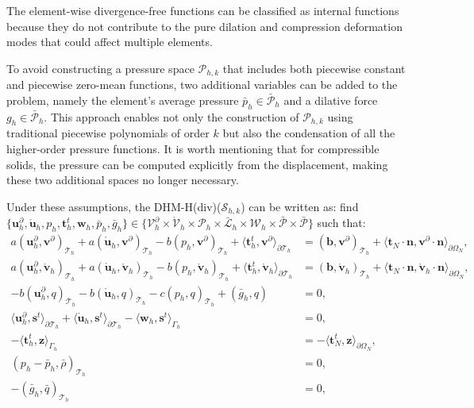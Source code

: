 \documentclass[english,11pt,3p,number,sort&compress]{elsarticle}
\begin{document}
The element-wise divergence-free functions can be classified as internal functions because they do not contribute to the pure dilation and compression deformation modes that could affect multiple elements.

To avoid constructing a pressure space $\mathcal{P}_{h,k}$ that includes both piecewise constant and piecewise zero-mean functions, two additional variables can be added to the problem, namely the element's average pressure $\bar{p}_h \in \bar{\mathcal{P}}_h$ and a dilative force $g_h \in \bar{\mathcal{P}}_{h}$. This approach enables not only the construction of $\mathcal{P}_{h,k}$ using traditional piecewise polynomials of order $k$ but also the condensation of all the higher-order pressure functions. It is worth mentioning that for compressible solids, the pressure can be computed explicitly from the displacement, making these two additional spaces no longer necessary.

Under these assumptions, the DHM-H(div)($\mathcal{S}_{h,k}$) can be written as: find $\{\bm{u}^\partial_h,\mathring{\bm{u}}_h,p_h,\bm{t}^t_h,\bm{w}_h,\bar{p}_h,\bar{g}_h\} \in \{\mathcal{V}^\partial_h \times \mathring{\mathcal{V}}_h \times \mathcal{P}_h \times \bar{\mathcal{L}}_h \times \mathcal{W}_h \times \bar{\mathcal{P}} \times \bar{\mathcal{P}} \}$ such that:
\begin{subequations} \label{eq:double-hybrid-six-field}
	\begin{align}
		a(\bm{u}^\partial_h,\bm{v}^\partial)_{\mathcal{T}_h} + a(\mathring{\bm{u}}_h,\bm{v}^\partial)_{\mathcal{T}_h} - b( p_h, \bm{v}^\partial)_{\mathcal{T}_h} +\langle\bm{t}^t_h,\bm{v}^\partial\rangle_{\partial\mathcal{T}_h} &= (\bm{b},\bm{v}^\partial)_{\mathcal{T}_h} + \langle\bm{t}_N\cdot\bm{n},\bm{v}^\partial\cdot\bm{n}\rangle_{\partial\Omega_N}, \label{eq:double-hybrid-six-field-a}\\
		a(\bm{u}^\partial_h,\mathring{\bm{v}}_h)_{\mathcal{T}_h} + a(\mathring{\bm{u}}_h,\mathring{\bm{v}}_h)_{\mathcal{T}_h} - b( p_h, \mathring{\bm{v}}_h)_{\mathcal{T}_h} +\langle\bm{t}^t_h,\mathring{\bm{v}}_h\rangle_{\partial\mathcal{T}_h} &= (\bm{b},\mathring{\bm{v}}_h)_{\mathcal{T}_h} + \langle\bm{t}_N\cdot\bm{n},\mathring{\bm{v}}_h\cdot\bm{n}\rangle_{\partial\Omega_N}, \label{eq:double-hybrid-six-field-b}\\ 
		-b(\bm{u}^\partial_h, q)_{\mathcal{T}_h} - b(\mathring{\bm{u}}_h, q)_{\mathcal{T}_h} - c(p_h,q)_{\mathcal{T}_h} + (\bar{g}_h,q) &= 0, \label{eq:double-hybrid-six-field-c}\\
		\langle\bm{u}^\partial_h,\bm{s}^t\rangle_{\partial\mathcal{T}_h} + \langle\mathring{\bm{u}}_h,\bm{s}^t\rangle_{\partial\mathcal{T}_h} - \langle\bm{w}_h,\bm{s}^t\rangle_{\Gamma_h} &= 0, \label{eq:double-hybrid-six-field-d}\\
		-\langle\bm{t}^t_h,\bm{z}\rangle_{\Gamma_h} &= -\langle\bm{t}_N^t,\bm{z}\rangle_{\partial\Omega_N}, \label{eq:double-hybrid-six-field-e}\\
		(p_h-\bar{p}_h,\bar{\rho})_{\mathcal{T}_h} &= 0, \label{eq:double-hybrid-six-field-f}\\
		-(\bar{g}_h,\bar{q})_{\mathcal{T}_h} &= 0, \label{eq:double-hybrid-six-field-g}
	\end{align}
\end{subequations}
\end{document}
